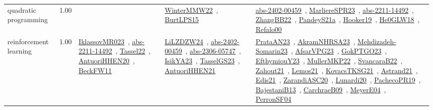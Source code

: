{\begin{longtable}{p{3cm}r>{\raggedright\arraybackslash}p{6cm}>{\raggedright\arraybackslash}p{6cm}>{\raggedright\arraybackslash}p{8cm}}
\index{quadratic programming}\index{Algorithms!quadratic programming}quadratic programming &  1.00 &  & \href{../works/WinterMMW22.pdf}{WinterMMW22}~\cite{WinterMMW22}, \href{../works/BurtLPS15.pdf}{BurtLPS15}~\cite{BurtLPS15} & \href{../works/abs-2402-00459.pdf}{abs-2402-00459}~\cite{abs-2402-00459}, \href{../works/MarliereSPR23.pdf}{MarliereSPR23}~\cite{MarliereSPR23}, \href{../works/abs-2211-14492.pdf}{abs-2211-14492}~\cite{abs-2211-14492}, \href{../works/ZhangBB22.pdf}{ZhangBB22}~\cite{ZhangBB22}, \href{../works/PandeyS21a.pdf}{PandeyS21a}~\cite{PandeyS21a}, \href{../works/Hooker19.pdf}{Hooker19}~\cite{Hooker19}, \href{../works/He0GLW18.pdf}{He0GLW18}~\cite{He0GLW18}, \href{../works/Refalo00.pdf}{Refalo00}~\cite{Refalo00}\\
\index{reinforcement learning}\index{Algorithms!reinforcement learning}reinforcement learning &  1.00 & \href{../works/IklassovMR023.pdf}{IklassovMR023}~\cite{IklassovMR023}, \href{../works/abs-2211-14492.pdf}{abs-2211-14492}~\cite{abs-2211-14492}, \href{../works/Tassel22.pdf}{Tassel22}~\cite{Tassel22}, \href{../works/AntuoriHHEN20.pdf}{AntuoriHHEN20}~\cite{AntuoriHHEN20}, \href{../works/BeckFW11.pdf}{BeckFW11}~\cite{BeckFW11} & \href{../works/LiLZDZW24.pdf}{LiLZDZW24}~\cite{LiLZDZW24}, \href{../works/abs-2402-00459.pdf}{abs-2402-00459}~\cite{abs-2402-00459}, \href{../works/abs-2306-05747.pdf}{abs-2306-05747}~\cite{abs-2306-05747}, \href{../works/IsikYA23.pdf}{IsikYA23}~\cite{IsikYA23}, \href{../works/TasselGS23.pdf}{TasselGS23}~\cite{TasselGS23}, \href{../works/AntuoriHHEN21.pdf}{AntuoriHHEN21}~\cite{AntuoriHHEN21} & \href{../works/PrataAN23.pdf}{PrataAN23}~\cite{PrataAN23}, \href{../works/AkramNHRSA23.pdf}{AkramNHRSA23}~\cite{AkramNHRSA23}, \href{../works/Mehdizadeh-Somarin23.pdf}{Mehdizadeh-Somarin23}~\cite{Mehdizadeh-Somarin23}, \href{../works/AfsarVPG23.pdf}{AfsarVPG23}~\cite{AfsarVPG23}, \href{../works/GokPTGO23.pdf}{GokPTGO23}~\cite{GokPTGO23}, \href{../works/EfthymiouY23.pdf}{EfthymiouY23}~\cite{EfthymiouY23}, \href{../works/MullerMKP22.pdf}{MullerMKP22}~\cite{MullerMKP22}, \href{../works/SvancaraB22.pdf}{SvancaraB22}~\cite{SvancaraB22}, \href{../works/Zahout21.pdf}{Zahout21}~\cite{Zahout21}, \href{../works/Lemos21.pdf}{Lemos21}~\cite{Lemos21}, \href{../works/KovacsTKSG21.pdf}{KovacsTKSG21}~\cite{KovacsTKSG21}, \href{../works/Astrand21.pdf}{Astrand21}~\cite{Astrand21}, \href{../works/Edis21.pdf}{Edis21}~\cite{Edis21}, \href{../works/ZarandiASC20.pdf}{ZarandiASC20}~\cite{ZarandiASC20}, \href{../works/Lunardi20.pdf}{Lunardi20}~\cite{Lunardi20}, \href{../works/PachecoPR19.pdf}{PachecoPR19}~\cite{PachecoPR19}, \href{../works/BajestaniB13.pdf}{BajestaniB13}~\cite{BajestaniB13}, \href{../works/CarchraeB09.pdf}{CarchraeB09}~\cite{CarchraeB09}, \href{../works/MeyerE04.pdf}{MeyerE04}~\cite{MeyerE04}, \href{../works/PerronSF04.pdf}{PerronSF04}~\cite{PerronSF04}\\

\end{longtable}}
